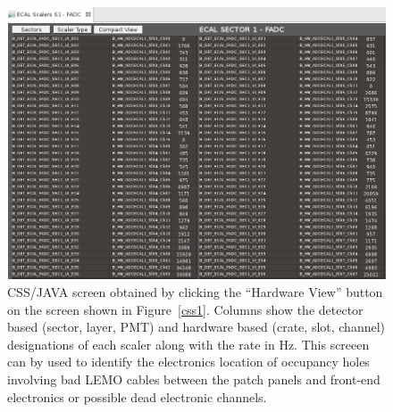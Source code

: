 \documentclass[letterpaper,10pt]{article}
\begin{document}
\begin{figure}[htbp]
  \centering
  \includegraphics[width= 7in, keepaspectratio = true]{css2}
  \vspace{2mm}
  \caption{CSS/JAVA screen obtained by clicking the ``Hardware View'' button on the screen shown in Figure~\ref{css1}.  Columns show the detector based (sector, layer, PMT) and hardware based (crate, slot, channel) designations of each scaler along with the rate in Hz. This screeen can by used to identify the electronics location of occupancy holes involving bad LEMO cables between the patch panels and front-end electronics or possible dead electronic channels.}
\label{css2}
\end{figure}
\end{document}
